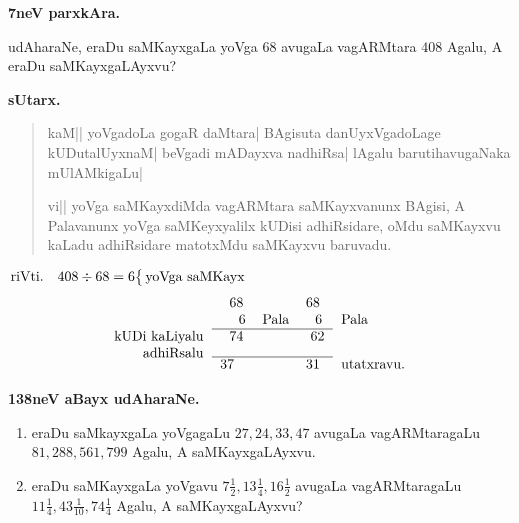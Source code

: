 \begin{center}
{\bf 7neV parxkAra.}
\end{center}

udAharaNe, eraDu saMKayxgaLa yoVga $68$ avugaLa vagARMtara $408$ Agalu, A eraDu saMKayxgaLAyxvu?

\begin{center}
{\bf\large sUtarx.}
\end{center}

\begin{verse}
kaM|| yoVgadoLa gogaR daMtara| BAgisuta danUyxVgadoLage kUDutalUyxnaM| beVgadi mADayxva nadhiRsa| lAgalu barutihavugaNaka mUlAMkigaLu|

vi|| yoVga saMKayxdiMda vagARMtara saMKayxvanunx BAgisi, A Palavanunx yoVga saMKeyxyalilx kUDisi adhiRsidare, oMdu saMKayxvu kaLadu adhiRsidare matotxMdu saMKayxvu baruvadu.
\end{verse}

$
\left.
\begin{aligned}
& \text{riVti.} & 408 \div 68=6\\
\end{aligned}
\right \{ 
\text{yoVga saMKayx}\\[-12pt]
$
\begin{equation*}
\begin{aligned}
\begin{tabular}{r>{$}l<{$}>{$}l<{$}>{$}l<{$}l}
  &~~68 &&  68 \\
  &\quad~6 & \text{Pala} &  ~~6&  Pala\\
\cline{2-4}
kUDi kaLiyalu & ~~74 && ~62\\
adhiRsalu&\\[-4pt] \cline{2-4}
& 37 && 31 & utatxravu.
\end{tabular}
\end{aligned}
\end{equation*}

\begin{center}
{\bf\large 138neV aBayx udAharaNe.}
\end{center}

\begin{enumerate}[\rm(1)]
\item eraDu saMkayxgaLa yoVgagaLu $27, 24, 33, 47$ avugaLa vagARMtaragaLu $81, 288, 561, 799$ Agalu, A saMKayxgaLAyxvu.

\item eraDu saMKayxgaLa yoVgavu $7\tfrac{1}{2}, 13\tfrac{1}{4}, 16\tfrac{1}{2}$ avugaLa vagARMtaragaLu $11\tfrac{1}{4}, 43\tfrac{1}{10}, 74\tfrac{1}{4}$ Agalu, A saMKayxgaLAyxvu?
\end{enumerate}

